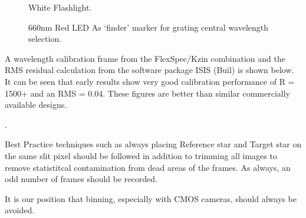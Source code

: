 \documentclass[letterpaper,10pt,english,openany,oneside]{sphinxmanual}
\begin{document}
\begin{figure}[htbp]
\centering
\capstart

\noindent{}
\caption{White Flashlight.}\label{\detokenize{callamps:id4}}\end{figure}

\begin{figure}[htbp]
\centering
\capstart

\noindent{}
\caption{660nm Red LED As ‘finder’ marker for grating central wavelength selection.}\label{\detokenize{callamps:id5}}\end{figure}

\sphinxAtStartPar
A wavelength calibration frame from the FlexSpec/Kzin combination and the
RMS residual calculation from the software package ISIS (Buil) is shown below.
It can be seen that early results show very good calibration performance
of R = 1500+ and an RMS = 0.04.  These figures are better than similar
commercially available designs.

\begin{figure}[htbp]
\centering

\noindent{}
\end{figure}

\sphinxAtStartPar
.

\begin{figure}[htbp]
\centering

\noindent{}
\end{figure}

\sphinxAtStartPar
Best Practice techniques such as always placing Reference star and
Target star on the same slit pixel should be followed in addition
to trimming all images to remove statistitcal contamination
from dead areas of the frames.  As always, an odd number of frames
should be recorded.

\sphinxAtStartPar
It is our position that binning, especially with CMOS cameras, should
always be avoided.
\end{document}
